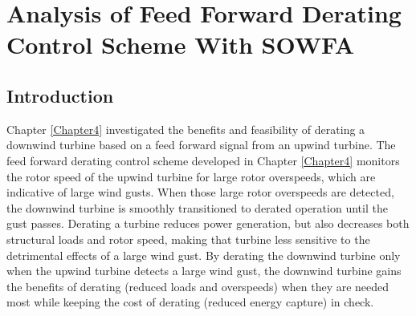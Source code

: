
\chapter{Analysis of Feed Forward Derating Control Scheme With SOWFA} %

\label{Chapter6} %



\section{Introduction} \label{section6-1}

Chapter \ref{Chapter4} investigated the benefits and feasibility of derating a downwind turbine based on a feed forward signal from an upwind turbine. The feed forward derating control scheme developed in Chapter \ref{Chapter4} monitors the rotor speed of the upwind turbine for large rotor overspeeds, which are indicative of large wind gusts. When those large rotor overspeeds are detected, the downwind turbine is smoothly transitioned to derated operation until the gust passes. Derating a turbine reduces power generation, but also decreases both structural loads and rotor speed, making that turbine less sensitive to the detrimental effects of a large wind gust. By derating the downwind turbine only when the upwind turbine detects a large wind gust, the downwind turbine gains the benefits of derating (reduced loads and overspeeds) when they are needed most while keeping the cost of derating (reduced energy capture) in check.

